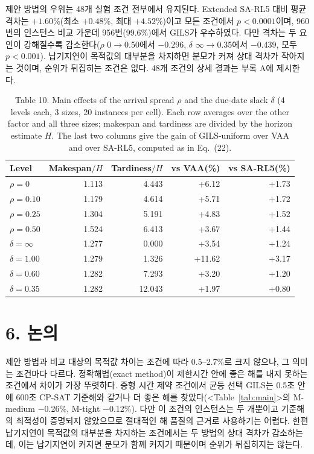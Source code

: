 \documentclass[10pt,a4paper]{article}
\begin{document}
제안 방법의 우위는 48개 실험 조건 전부에서 유지된다. Extended SA-RL5 대비 평균 격차는 $+1.60$\%(최소 $+0.48$\%,
최대 $+4.52$\%)이고 모든 조건에서 $p<0.0001$이며, 960번의 인스턴스 비교 가운데 956번(99.6\%)에서 GILS가 우수하였다.
다만 격차는 두 요인이 강해질수록 감소한다($\rho$ 0$\rightarrow$0.50에서 $-0.296$, $\delta$ $\infty\rightarrow$0.35에서
$-0.439$, 모두 $p<0.001$). 납기지연이 목적값의 대부분을 차지하면 분모가 커져 상대 격차가 작아지는 것이며,
순위가 뒤집히는 조건은 없다. 48개 조건의 상세 결과는 부록 A에 제시한다.

\begin{table}[H]\centering
\caption{Table 10. Main effects of the arrival spread $\rho$ and the due-date slack $\delta$ (4 levels each, 3 sizes, 20 instances per cell). Each row averages over the other factor and all three sizes; makespan and tardiness are divided by the horizon estimate $H$. The last two columns give the gain of GILS-uniform over VAA and over SA-RL5, computed as in Eq.~(22).}
\label{tab:tweff}\small
\begin{tabular}{@{}lrrrr@{}}
\toprule
Level & Makespan$/H$ & Tardiness$/H$ & vs VAA(\%) & vs SA-RL5(\%)\\
\midrule
$\rho=0$ & 1.113 & 4.443 & +6.12 & +1.73\\
$\rho=0.10$ & 1.179 & 4.614 & +5.71 & +1.72\\
$\rho=0.25$ & 1.304 & 5.191 & +4.83 & +1.52\\
$\rho=0.50$ & 1.524 & 6.413 & +3.67 & +1.44\\
\midrule
$\delta=\infty$ & 1.277 & 0.000 & +3.54 & +1.24\\
$\delta=1.00$ & 1.279 & 1.326 & +11.62 & +3.17\\
$\delta=0.60$ & 1.282 & 7.293 & +3.20 & +1.20\\
$\delta=0.35$ & 1.282 & 12.043 & +1.97 & +0.80\\
\bottomrule
\end{tabular}
\end{table}

\section{6. 논의}
제안 방법과 비교 대상의 목적값 차이는 조건에 따라 0.5--2.7\%로 크지 않으나, 그 의미는 조건마다 다르다.
정확해법(exact method)이 제한시간 안에 좋은 해를 내지 못하는 조건에서 차이가 가장 뚜렷하다. 중형 시간 제약 조건에서
균등 선택 GILS는 0.5초 안에 600초 CP-SAT 기준해와 같거나 더 좋은 해를 찾았다(<Table~\ref{tab:main}>의 M-medium
$-$0.26\%, M-tight $-$0.12\%). 다만 이 조건의 인스턴스는 두 개뿐이고 기준해의 최적성이 증명되지 않았으므로
절대적인 해 품질의 근거로 사용하기는 어렵다. 한편 납기지연이 목적값의 대부분을 차지하는 조건에서는 두 방법의
상대 격차가 감소하는데, 이는 납기지연이 커지면 분모가 함께 커지기 때문이며 순위가 뒤집히지는 않는다.
\end{document}
